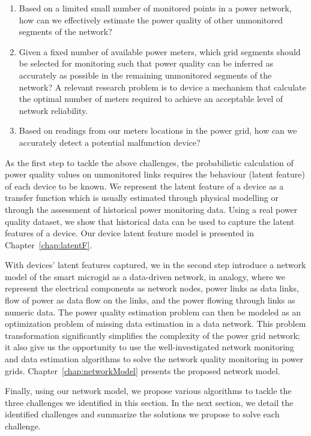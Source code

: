 \begin{enumerate}
\item Based on a limited small number of monitored points in a power network, how can we effectively estimate the power quality of other unmonitored segments of the network?

\item Given a fixed number of available power meters, which grid segments should be selected for monitoring such that power quality can be inferred as accurately as possible in the remaining unmonitored segments of the network? A relevant research problem is to device a mechanism that calculate the optimal number of meters required to achieve an acceptable level of network reliability.

\item Based on readings from our meters locations in the power grid, how can we accurately detect a potential malfunction device?

\end{enumerate}

As the first step to tackle the above challenges, the probabilistic calculation of power quality values on unmonitored links requires the behaviour (latent feature) of each device to be known. We represent the latent feature of a device as a transfer function which is usually estimated through physical modelling or through the assessment of historical power monitoring data. Using a real power quality dataset, we show that historical data can be used to capture the latent features of a device. Our device latent feature model is presented in Chapter~\ref{chap:latentF}.

With devices' latent features captured, we in the second step introduce a network model of the smart microgid as a data-driven network, in analogy, where we represent the electrical components as network nodes, power links as data links, flow of power as data flow on the links, and the power flowing through links as numeric data. The power quality estimation problem can then be modeled as an optimization problem of missing data estimation in a data network. This problem transformation significantly simplifies the complexity of the power grid network; it also give us the opportunity to use the well-investigated network monitoring and data estimation algorithms to solve the network quality monitoring in power grids. Chapter~\ref{chap:networkModel} presents the proposed network model.

Finally, using our network model, we propose various algorithms to tackle the three challenges we identified in this section. In the next section, we detail the identified challenges and summarize the solutions we propose to solve each challenge.

